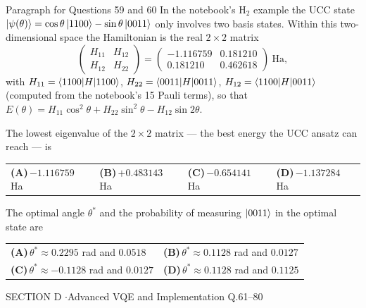 \documentclass[11pt,a4paper]{article}
\newcommand{\optlabel}[1]{\textbf{(#1)}}
\newenvironment{qitem}[1]{\begin{list}{}{\setlength{\leftmargin}{3.3em}\setlength{\labelwidth}{3.1em}%
  \setlength{\labelsep}{0.2em}\setlength{\topsep}{3pt}\setlength{\parsep}{3pt}}\item[\textbf{Q.#1}\hfill]}{\end{list}}
\newcommand{\qsep}{\par\vspace{2pt}{\color{black!15}\hrule}\vspace{4pt}}
\begin{document}
\begin{passagebox}{Paragraph for Questions 59 and 60}
In the notebook's H$_2$ example the UCC state $\ket{\psi(\theta)} = \cos\theta\ket{1100} - \sin\theta\ket{0011}$ only involves two basis states. Within
this two-dimensional space the Hamiltonian is the real $2\times2$ matrix
\[ \begin{pmatrix} H_{11} & H_{12}\\ H_{12} & H_{22}\end{pmatrix} = \begin{pmatrix} -1.116759 & 0.181210\\ 0.181210 & 0.462618\end{pmatrix}\ \text{Ha}, \]
with $H_{11} = \braket{1100|H|1100}$, $H_{22} = \braket{0011|H|0011}$, $H_{12} = \braket{1100|H|0011}$ (computed from the notebook's 15 Pauli terms), so that
$E(\theta) = H_{11}\cos^2\theta + H_{22}\sin^2\theta - H_{12}\sin2\theta$.
\end{passagebox}
\begin{qitem}{59}
The lowest eigenvalue of the $2\times2$ matrix --- the best energy the UCC ansatz can reach --- is
\par\smallskip\noindent\begin{tabularx}{\linewidth}{@{}*{4}{L}@{}}
\optlabel{A}\,$-1.116759$ Ha & \optlabel{B}\,$+0.483143$ Ha & \optlabel{C}\,$-0.654141$ Ha & \optlabel{D}\,$-1.137284$ Ha
\end{tabularx}
\end{qitem}
\qsep

\begin{qitem}{60}
The optimal angle $\theta^*$ and the probability of measuring $\ket{0011}$ in the optimal state are
\par\smallskip\noindent\begin{tabularx}{\linewidth}{@{}*{2}{L}@{}}
\optlabel{A}\,$\theta^* \approx 0.2295$ rad and $0.0518$ & \optlabel{B}\,$\theta^* \approx 0.1128$ rad and $0.0127$ \\[3pt]
\optlabel{C}\,$\theta^* \approx -0.1128$ rad and $0.0127$ & \optlabel{D}\,$\theta^* \approx 0.1128$ rad and $0.1125$
\end{tabularx}
\end{qitem}
\qsep

\newpage

\begin{sectionbanner}SECTION D \enspace$\cdot$\enspace Advanced VQE and Implementation \hfill Q.61--80\end{sectionbanner}
\end{document}

